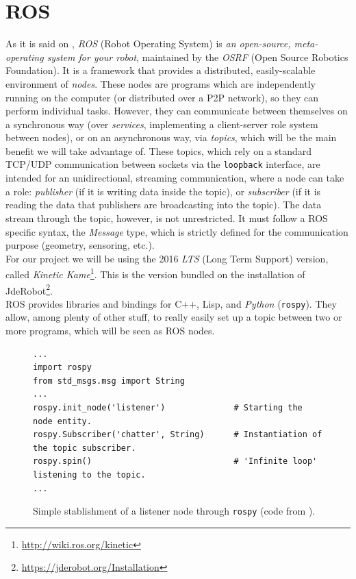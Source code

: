 \section{ROS}
	\label{sec:3_ros}
	As it is said on \cite{ros-intro}, \emph{ROS} (Robot Operating System) is \textit{an open-source, meta-operating system for your robot}, maintained by the \emph{OSRF} (Open Source Robotics Foundation). It is a framework that provides a distributed, easily-scalable environment of \emph{nodes}. These nodes are programs which are independently running on the computer (or distributed over a P2P network), so they can perform individual tasks. However, they can communicate between themselves on a synchronous way (over \emph{services}, implementing a client-server role system between nodes), or on an asynchronous way, via \textit{topics}, which will be the main benefit we will take advantage of. These topics, which rely on a standard TCP/UDP communication between sockets via the \texttt{loopback} interface, are intended for an unidirectional, streaming communication, where a node can take a role: \emph{publisher} (if it is writing data inside the topic), or \emph{subscriber} (if it is reading the data that publishers are broadcasting into the topic). The data stream through the topic, however, is not unrestricted. It must follow a ROS specific syntax, the \emph{Message} type, which is strictly defined for the communication purpose (geometry, sensoring, etc.).\\
	
	For our project we will be using the 2016 \textit{LTS} (Long Term Support) version, called \textit{Kinetic Kame}\footnote{\url{http://wiki.ros.org/kinetic}}. This is the version bundled on the installation of JdeRobot\footnote{\url{https://jderobot.org/Installation}}.\\
	
	ROS provides libraries and bindings for C++, Lisp, and \textit{Python} (\texttt{rospy}). They allow, among plenty of other stuff, to really easily set up a topic between two or more programs, which will be seen as ROS nodes.\\
	\begin{figure}[h]
		\begin{lstlisting}
...
import rospy
from std_msgs.msg import String
...
rospy.init_node('listener')              # Starting the node entity.
rospy.Subscriber('chatter', String)      # Instantiation of the topic subscriber.
rospy.spin()                             # 'Infinite loop' listening to the topic.
...
		\end{lstlisting}
		\caption{Simple stablishment of a listener node through \texttt{rospy} (code from \cite{listener-rospy}).}
		\label{fig:3_rospy_listener}
	\end{figure}
	
